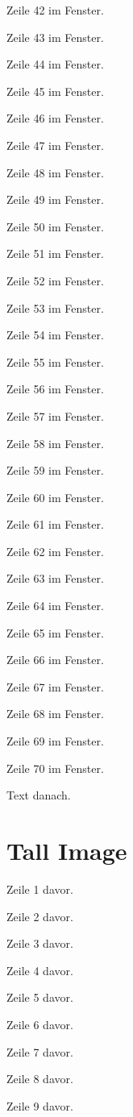 \begin{Figure}[title=Tall Figure]
Zeile 42 im Fenster.

Zeile 43 im Fenster.

Zeile 44 im Fenster.

Zeile 45 im Fenster.

Zeile 46 im Fenster.

Zeile 47 im Fenster.

Zeile 48 im Fenster.

Zeile 49 im Fenster.

Zeile 50 im Fenster.

Zeile 51 im Fenster.

Zeile 52 im Fenster.

Zeile 53 im Fenster.

Zeile 54 im Fenster.

Zeile 55 im Fenster.

Zeile 56 im Fenster.

Zeile 57 im Fenster.

Zeile 58 im Fenster.

Zeile 59 im Fenster.

Zeile 60 im Fenster.

Zeile 61 im Fenster.

Zeile 62 im Fenster.

Zeile 63 im Fenster.

Zeile 64 im Fenster.

Zeile 65 im Fenster.

Zeile 66 im Fenster.

Zeile 67 im Fenster.

Zeile 68 im Fenster.

Zeile 69 im Fenster.

Zeile 70 im Fenster.

\end{Figure}

Text danach.

\clearpage
\section{Tall Image}
Zeile 1 davor.

Zeile 2 davor.

Zeile 3 davor.

Zeile 4 davor.

Zeile 5 davor.

Zeile 6 davor.

Zeile 7 davor.

Zeile 8 davor.

Zeile 9 davor.


